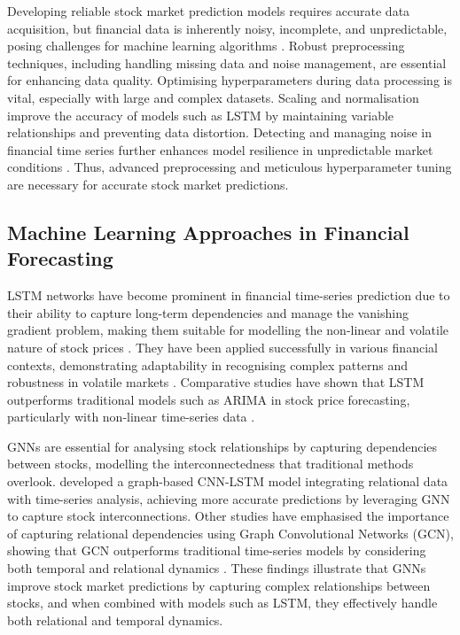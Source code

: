 Developing reliable stock market prediction models requires accurate data acquisition, but financial data is inherently noisy, incomplete, and unpredictable, posing challenges for machine learning algorithms \citep{hadavandi2010}. Robust preprocessing techniques, including handling missing data and noise management, are essential for enhancing data quality. Optimising hyperparameters during data processing is vital, especially with large and complex datasets. Scaling and normalisation improve the accuracy of models such as LSTM by maintaining variable relationships and preventing data distortion. Detecting and managing noise in financial time series further enhances model resilience in unpredictable market conditions \citep{yeung2020}. Thus, advanced preprocessing and meticulous hyperparameter tuning are necessary for accurate stock market predictions.

\subsection{Machine Learning Approaches in Financial Forecasting}

LSTM networks have become prominent in financial time-series prediction due to their ability to capture long-term dependencies and manage the vanishing gradient problem, making them suitable for modelling the non-linear and volatile nature of stock prices \citep{fjellstrom2022}. They have been applied successfully in various financial contexts, demonstrating adaptability in recognising complex patterns and robustness in volatile markets \citep{yeung2020, zhao2023}. Comparative studies have shown that LSTM outperforms traditional models such as ARIMA in stock price forecasting, particularly with non-linear time-series data \citep{shankar2022, jarrah2023}.

GNNs are essential for analysing stock relationships by capturing dependencies between stocks, modelling the interconnectedness that traditional methods overlook. \citep{shi2024} developed a graph-based CNN-LSTM model integrating relational data with time-series analysis, achieving more accurate predictions by leveraging GNN to capture stock interconnections. Other studies have emphasised the importance of capturing relational dependencies using Graph Convolutional Networks (GCN), showing that GCN outperforms traditional time-series models by considering both temporal and relational dynamics \citep{singh2021, chen2018}. These findings illustrate that GNNs improve stock market predictions by capturing complex relationships between stocks, and when combined with models such as LSTM, they effectively handle both relational and temporal dynamics.

